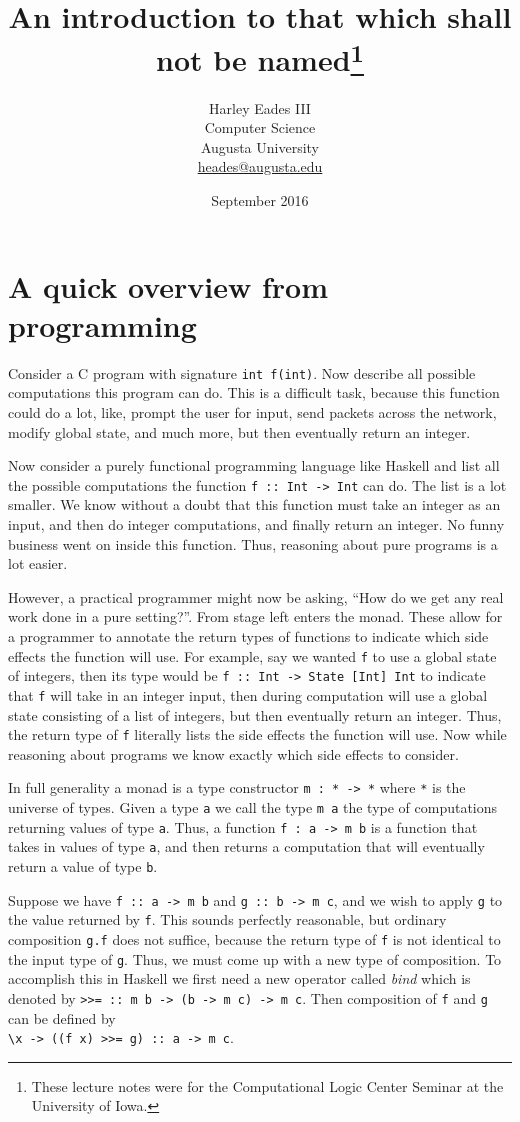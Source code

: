 \documentclass{article}
\title{An introduction to that which shall not be named\footnote{These lecture notes were for the Computational Logic Center Seminar at the University of Iowa.}}
\author{Harley Eades III\\Computer Science\\Augusta University\\\href{mailto:heades@augusta.edu}{heades@augusta.edu}}
\date{September 2016}
\begin{document}
\maketitle

\section{A quick overview from programming}
\label{sec:a_quick_example_from_programming}
Consider a C program with signature \verb!int f(int)!.  Now describe
all possible computations this program can do.  This is a difficult
task, because this function could do a lot, like, prompt the user for
input, send packets across the network, modify global state, and much
more, but then eventually return an integer.

Now consider a purely functional programming language like Haskell
\cite{Haskell} and list all the possible computations the function
\verb!f :: Int -> Int! can do. The list is a lot smaller.  We know
without a doubt that this function must take an integer as an input,
and then do integer computations, and finally return an integer.  No
funny business went on inside this function.  Thus, reasoning about
pure programs is a lot easier.

However, a practical programmer might now be asking, ``How do we get
any real work done in a pure setting?''.  From stage left enters the
monad.  These allow for a programmer to annotate the return types of
functions to indicate which side effects the function will use.  For
example, say we wanted \verb!f! to use a global state of integers,
then its type would be \verb!f :: Int -> State [Int] Int! to indicate
that \verb!f! will take in an integer input, then during computation
will use a global state consisting of a list of integers, but then
eventually return an integer.  Thus, the return type of \verb!f!
  literally lists the side effects the function will use.  Now while
  reasoning about programs we know exactly which side effects to
  consider.

In full generality a monad is a type constructor \verb!m : * -> *!
where \verb!*! is the universe of types.  Given a type \verb!a! we
call the type \verb!m a! the type of computations returning values
of type \verb!a!.  Thus, a function \verb!f : a -> m b! is a function that
takes in values of type \verb!a!, and then returns a computation that
will eventually return a value of type \verb!b!.

Suppose we have \verb!f :: a -> m b! and \verb!g :: b -> m c!, and we
wish to apply \verb!g! to the value returned by \verb!f!. This sounds
perfectly reasonable, but ordinary composition \verb!g.f! does not
suffice, because the return type of \verb!f! is not identical to the
input type of \verb!g!.  Thus, we must come up with a new type of
composition.  To accomplish this in Haskell we first need a new
operator called \textit{bind} which is denoted by
\verb!>>= :: m b -> (b -> m c) -> m c!.  Then composition of \verb!f!
and \verb!g! can be defined by\\
\verb!\x -> ((f x) >>= g) :: a -> m c!.
\end{document}
